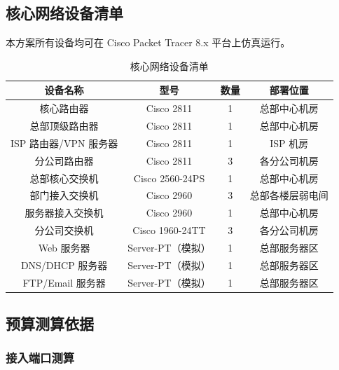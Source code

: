 \documentclass[12pt,a4paper]{ctexart}
\begin{document}
\subsection{核心网络设备清单}

本方案所有设备均可在 Cisco Packet Tracer 8.x 平台上仿真运行。

\begin{table}[H]
\centering
\caption{核心网络设备清单}
\label{tab:device-list}
\begin{tabular}{|c|c|c|c|}
\hline
\textbf{设备名称}       & \textbf{型号}           & \textbf{数量} & \textbf{部署位置}   \\ \hline
核心路由器              & Cisco 2811              & 1             & 总部中心机房         \\ \hline
总部顶级路由器          & Cisco 2811              & 1             & 总部中心机房         \\ \hline
ISP 路由器/VPN 服务器   & Cisco 2811              & 1             & ISP 机房             \\ \hline
分公司路由器            & Cisco 2811              & 3             & 各分公司机房         \\ \hline
总部核心交换机          & Cisco 2560-24PS         & 1             & 总部中心机房         \\ \hline
部门接入交换机          & Cisco 2960              & 3             & 总部各楼层弱电间     \\ \hline
服务器接入交换机        & Cisco 2960              & 1             & 总部中心机房         \\ \hline
分公司交换机            & Cisco 1960-24TT         & 3             & 各分公司机房         \\ \hline
Web 服务器              & Server-PT（模拟）       & 1             & 总部服务器区         \\ \hline
DNS/DHCP 服务器         & Server-PT（模拟）       & 1             & 总部服务器区         \\ \hline
FTP/Email 服务器        & Server-PT（模拟）       & 1             & 总部服务器区         \\ \hline
\end{tabular}
\end{table}

\subsection{预算测算依据}

\subsubsection{接入端口测算}
\end{document}
